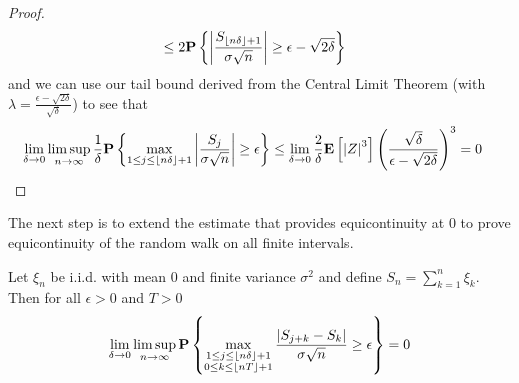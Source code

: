 \begin{proof}
\begin{align*}
&\leq 2 \textbf{P}\left \{\left \vert \frac{S_{\left \lfloor n\delta \right \rfloor+1}}{\sigma \sqrt{n}} \right \vert
  \geq \epsilon - \sqrt{2\delta} \right \} 
\end{align*}
and we can use our tail bound derived from the Central Limit Theorem
(with $\lambda = \frac{\epsilon - \sqrt{2\delta}}{\sqrt{\delta}}$)
to see that 
\begin{align*}
\lim_{\delta \to 0} \limsup_{n \to \infty} \frac{1}{\delta} \textbf{P}\left \{\max_{1 \leq j \leq \left \lfloor n\delta \right \rfloor + 1} \left \vert \frac{S_j}{\sigma \sqrt{n}} \right \vert \geq \epsilon \right \}
&\leq \lim_{\delta \to 0 } \frac{2}{\delta} \textbf{E}\left[\left \vert Z \right \vert^3\right]
\left(\frac {\sqrt{\delta}}{\epsilon - \sqrt{2\delta}}\right)^3 = 0
\end{align*}
\end{proof}

The next step is to extend the estimate that provides equicontinuity
at $0$ to prove equicontinuity of the random walk on all finite intervals.  
\begin{lem}\label{RandomWalkEquicontinuity}
Let $\xi_n$ be i.i.d. with mean $0$ and finite variance
  $\sigma^2$ and define $S_n = \sum_{k=1}^n \xi_k$.  Then for all
  $\epsilon > 0$ and $T > 0$ 
\begin{align*}
\lim_{\delta \to 0} \limsup_{n \to \infty} 
\textbf{P}\left \{\max_{
\substack{1 \leq j \leq \left \lfloor n\delta \right \rfloor+1 \\
0 \leq k \leq \left \lfloor nT \right \rfloor+1}} \frac{\left \vert S_{j+k}
    - S_k \right \vert}{\sigma\sqrt{n}} \geq
  \epsilon \right \} = 0
\end{align*}
\end{lem}
